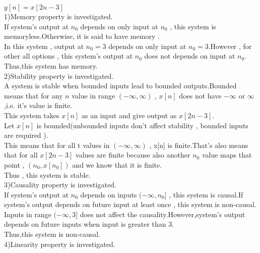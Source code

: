 \documentclass[10pt,a4paper, margin=1in]{article}
\begin{document}
\begin{enumerate}
\begin{enumerate}
    $y[n] = x[2n-3]$ \\
    
    1)Memory property is investigated.\\
    
    If system's output at $n_0$ depends on only input at $n_0$ , this system is memoryless.Otherwise, it is said to have memory .\\
    In this system , output at $n_0 = 3 $ depends on only input at $n_0 = 3 $.However , for other all options , this system's output at $n_0 $ does not depends on input at $n_0 $.\\ 
    Thus,this system has memory.\\
 
 	2)Stability property is investigated.\\
 	
 	A system is stable when bounded inputs lead to bounded outputs.Bounded means that for any $n$ value in range $(-\infty , \infty)$ , $x[n]$ does not have $-\infty$ or $\infty$,i.e. it's value is finite.\\
 	
 	This system takes $x[n]$ as an input and give output as $x[2n-3]$.\\
 	
 	Let $x[n]$ is bounded(unbounded inputs don't affect stability , bounded inputs are required ).\\This means that for all t values in $(-\infty , \infty)$ , x[n] is finite.That's also means that for all $x[2n-3]$ values are finite because also another $n_0$ value maps that point , $(n_0 , x[n_0])$ and we know that it is finite.\\
 	
 	Thus , this system is stable.\\ 
 	
 	3)Causality property is investigated.\\
 	
 	If system's output at $n_0$ depends on inputs $(-\infty ,n_0]$ , this system is causal.If system's output depends on future input at least once , this system is non-causal.\\
 	Inputs in range $(-\infty,3]$ does not affect the causality.However,system's output depends on future inputs when input is greater than 3.\\
 	Thus,this system is non-causal.\\
 	
 	4)Linearity property is investigated.\\
 	

\end{enumerate}
\end{enumerate}
\end{document}
